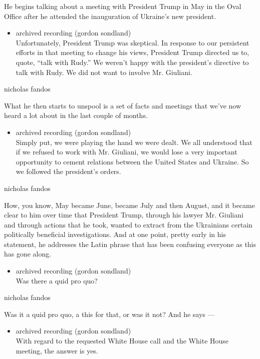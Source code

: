 He begins talking about a meeting with President Trump in May in the
Oval Office after he attended the inauguration of Ukraine's new
president.

\begin{itemize}
\tightlist
\item
  archived recording (gordon sondland)\\
  Unfortunately, President Trump was skeptical. In response to our
  persistent efforts in that meeting to change his views, President
  Trump directed us to, quote, ``talk with Rudy.'' We weren't happy with
  the president's directive to talk with Rudy. We did not want to
  involve Mr. Giuliani.
\end{itemize}

nicholas fandos

What he then starts to unspool is a set of facts and meetings that we've
now heard a lot about in the last couple of months.

\begin{itemize}
\tightlist
\item
  archived recording (gordon sondland)\\
  Simply put, we were playing the hand we were dealt. We all understood
  that if we refused to work with Mr. Giuliani, we would lose a very
  important opportunity to cement relations between the United States
  and Ukraine. So we followed the president's orders.
\end{itemize}

nicholas fandos

How, you know, May became June, became July and then August, and it
became clear to him over time that President Trump, through his lawyer
Mr. Giuliani and through actions that he took, wanted to extract from
the Ukrainians certain politically beneficial investigations. And at one
point, pretty early in his statement, he addresses the Latin phrase that
has been confusing everyone as this has gone along.

\begin{itemize}
\tightlist
\item
  archived recording (gordon sondland)\\
  Was there a quid pro quo?
\end{itemize}

nicholas fandos

Was it a quid pro quo, a this for that, or was it not? And he says ---

\begin{itemize}
\tightlist
\item
  archived recording (gordon sondland)\\
  With regard to the requested White House call and the White House
  meeting, the answer is yes.
\end{itemize}

